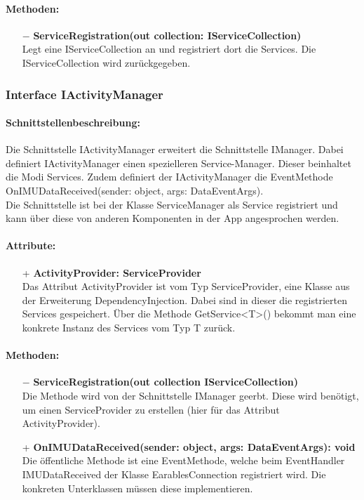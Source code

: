 \documentclass[a4paper,12pt]{article}
\begin{document}
	\paragraph{Methoden:}
	\begin{itemize}
		\item[$-$] \textbf{ServiceRegistration(out collection: IServiceCollection)}\\Legt eine IServiceCollection an und registriert dort die Services. Die IServiceCollection wird zurückgegeben.
	\end{itemize}
	
	\subsubsection{Interface IActivityManager}
	\paragraph{Schnittstellenbeschreibung:}
	Die Schnittstelle IActivityManager erweitert die Schnittstelle IManager. Dabei definiert IActivityManager einen spezielleren Service-Manager. Dieser beinhaltet die Modi Services. Zudem definiert der IActivityManager die EventMethode OnIMUDataReceived(sender: object, args: DataEventArgs).\\
	Die Schnittstelle ist bei der Klasse ServiceManager als Service registriert und kann über diese von anderen Komponenten in der App angesprochen werden.
	
	\paragraph{Attribute:}
	\begin{itemize}
		\item[+] \textbf{ActivityProvider: ServiceProvider}\\Das Attribut ActivityProvider ist vom Typ ServiceProvider, eine Klasse aus der Erweiterung \Gls{DependencyInjection}. Dabei sind in dieser die registrierten Services gespeichert. Über die Methode GetService<T>() bekommt man eine konkrete Instanz des Services vom Typ T zurück. 
	\end{itemize}
	
	\paragraph{Methoden:}
	\begin{itemize}
		\item[$-$] \textbf{ServiceRegistration(out collection IServiceCollection)}\\Die Methode wird von der Schnittstelle IManager geerbt. Diese wird benötigt, um einen ServiceProvider zu erstellen (hier für das Attribut ActivityProvider).
		\item[+] \textbf{OnIMUDataReceived(sender: object, args: DataEventArgs): void}\\Die öffentliche Methode ist eine EventMethode, welche beim EventHandler IMUDataReceived der Klasse EarablesConnection registriert wird. Die konkreten Unterklassen müssen diese implementieren. 
	\end{itemize}
	
\end{document}
